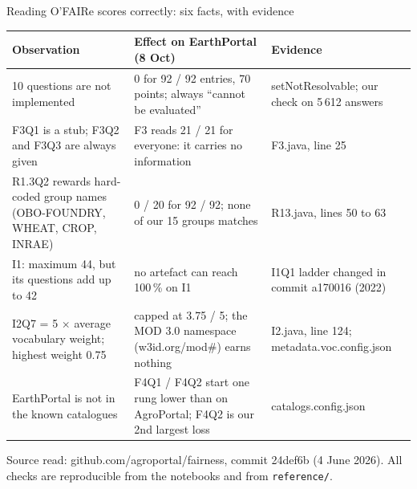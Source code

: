 \documentclass[aspectratio=169,10pt]{beamer}
\newcommand{\evidence}[1]{{\scriptsize\color{dtgrey}#1}}
\begin{document}
\begin{frame}{Reading O'FAIRe scores correctly: six facts, with evidence}
  \scriptsize
  \renewcommand{\arraystretch}{1.12}
  \begin{tabularx}{\textwidth}{@{}>{\raggedright}p{4.4cm} >{\raggedright}X >{\raggedright\arraybackslash}p{3.3cm}@{}}
    \toprule
    \textbf{Observation} & \textbf{Effect on EarthPortal (8 Oct)} & \textbf{Evidence}\\
    \midrule
    10 questions are not implemented & 0 for 92 / 92 entries, 70 points; always ``cannot be evaluated''
      & setNotResolvable; our check on 5\,612 answers\\
    F3Q1 is a stub; F3Q2 and F3Q3 are always given & F3 reads 21 / 21 for everyone: it carries no information
      & F3.java, line 25\\
    R1.3Q2 rewards hard-coded group names (OBO-FOUNDRY, WHEAT, CROP, INRAE) & 0 / 20 for 92 / 92; none of
      our 15 groups matches & R13.java, lines 50 to 63\\
    I1: maximum 44, but its questions add up to 42 & no artefact can reach 100\,\% on I1
      & I1Q1 ladder changed in commit a170016 (2022)\\
    I2Q7 = 5 $\times$ average vocabulary weight; highest weight 0.75 & capped at 3.75 / 5; the MOD 3.0
      namespace (w3id.org/mod\#) earns nothing & I2.java, line 124; metadata.voc.config.json\\
    EarthPortal is not in the known catalogues & F4Q1 / F4Q2 start one rung lower than on AgroPortal;
      F4Q2 is our 2nd largest loss & catalogs.config.json\\
    \bottomrule
  \end{tabularx}
  \vfill
  \evidence{Source read: github.com/agroportal/fairness, commit 24def6b (4 June 2026). All checks are
  reproducible from the notebooks and from \texttt{reference/}.}
\end{frame}
\end{document}
